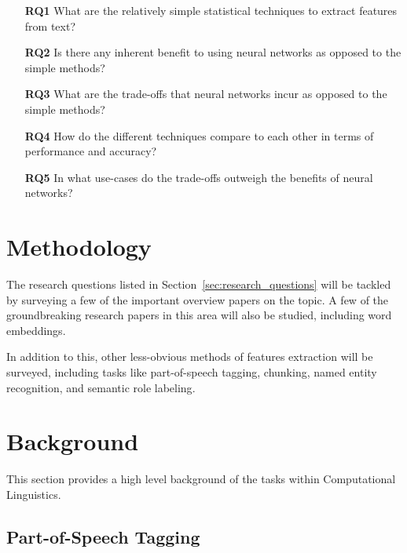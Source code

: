 \documentclass[11pt,a4paper]{article}
\begin{document}
  \begin{itemize}
    \item [\textbf{RQ1}]
    What are the relatively simple statistical techniques to extract features from text?
    \item [\textbf{RQ2}]
    Is there any inherent benefit to using neural networks as opposed to the simple methods?
    \item [\textbf{RQ3}]
    What are the trade-offs that neural networks incur as opposed to the simple methods?
    \item [\textbf{RQ4}]
    How do the different techniques compare to each other in terms of performance and accuracy?
    \item [\textbf{RQ5}]
    In what use-cases do the trade-offs outweigh the benefits of neural networks?
  \end{itemize}


\section{Methodology} %
\label{sec:methodology}

  The research questions listed in Section~\ref{sec:research_questions} will be tackled by surveying a few of the important overview papers on the topic\cite{goldberg2016primer}\cite{bengio2003neural}\cite{morin2005hierarchical}. A few of the groundbreaking research papers in this area will also be studied, including word embeddings\cite{mikolov2013efficient}\cite{mikolov2013distributed}\cite{mikolov2013linguistic}.

  In addition to this, other less-obvious methods of features extraction will be surveyed, including tasks like part-of-speech tagging, chunking, named entity recognition, and semantic role labeling\cite{socher2011parsing}\cite{luong2013better}\cite{maas2015lexicon}\cite{li2015hierarchical}\cite{collobert2011natural}\cite{pennington2014glove}.



\section{Background} %
\label{sec:background}

  This section provides a high level background of the tasks within Computational Linguistics.

  \subsection{Part-of-Speech Tagging} %
  \label{sub:part_of_speech_tagging}
\end{document}
